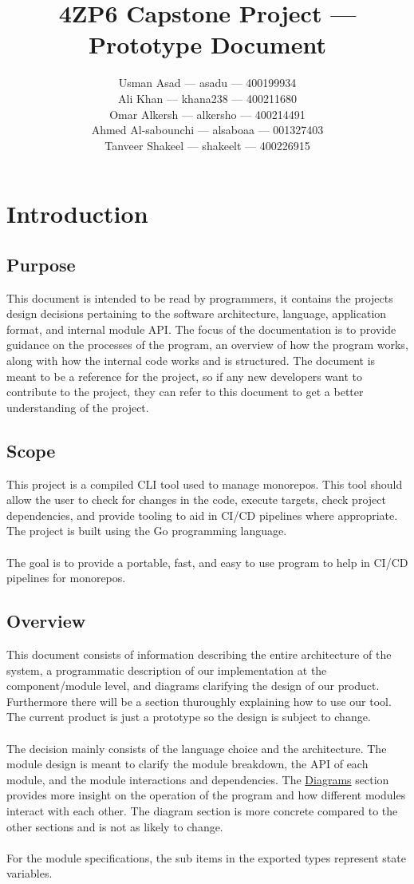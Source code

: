 \documentclass[11pt]{article}
\title{\textbf{4ZP6 Capstone Project --- Prototype Document}}
\author{Usman Asad --- asadu  --- 400199934\\
  Ali Khan --- khana238  --- 400211680\\
  Omar Alkersh --- alkersho --- 400214491 \\
  Ahmed Al-sabounchi --- alsaboaa --- 001327403 \\
  Tanveer Shakeel --- shakeelt --- 400226915}
\begin{document}
\maketitle
\tableofcontents
\newpage

\section{Introduction}

\subsection{Purpose}

This document is intended to be read by programmers, it contains the projects design
decisions pertaining to the software architecture, language, application format,
and internal module API. The focus of the documentation is to provide guidance on the
processes of the program, an overview of how the program works, along with how the internal
code works and is structured. The document is meant to be a reference for the project, so if
any new developers want to contribute to the project, they can refer to this document to get
a better understanding of the project.

\subsection{Scope}

This project is a compiled \Gls{CLI} tool used to manage \glspl{monorepo}. This
tool should allow the user to check for changes in the code, execute \glspl{target},
check project dependencies, and provide tooling to aid in \Gls{CI/CD} pipelines
where appropriate. The project is built using the Go programming language.
\\\\
The goal is to provide a portable, fast, and easy to use program to help in
CI/CD pipelines for \glspl{monorepo}.

\subsection{Overview}
This document consists of information describing the entire architecture of the system, a programmatic
description of our implementation at the component/module level, and diagrams clarifying the design of
our product. Furthermore there will be a section thuroughly explaining how to use our tool. The current
product is just a prototype so the design is subject to change.
\\\\
The decision mainly consists of the language choice and the architecture. The
module design is meant to clarify the module breakdown, the API of each module,
and the module interactions and dependencies. The
\hyperref[sec:diagrams]{Diagrams} section provides more insight on the operation
of the program and how different modules interact with each other. The diagram
section is more concrete compared to the other sections and is not as likely
to change.
\\\\
For the module specifications, the sub items in the exported types represent
state variables.
\end{document}
